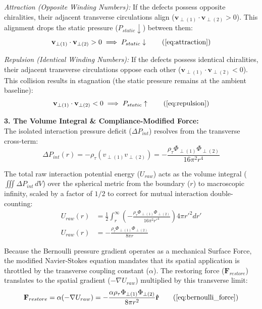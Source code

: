 \textit{Attraction (Opposite Winding Numbers):} If the defects possess opposite chiralities, their adjacent transverse circulations align ($\mathbf{v}_{\perp(1)} \cdot \mathbf{v}_{\perp(2)} > 0$). This alignment drops the static pressure ($P_{static} \downarrow$) between them:
\begin{equation}
    \mathbf{v}_{\perp(1)} \cdot \mathbf{v}_{\perp(2)} > 0 \implies P_{static} \downarrow \tag{\ref{eq:attraction}}
\end{equation}

\textit{Repulsion (Identical Winding Numbers):} If the defects possess identical chiralities, their adjacent transverse circulations oppose each other ($\mathbf{v}_{\perp(1)} \cdot \mathbf{v}_{\perp(2)} < 0$). This collision results in stagnation (the static pressure remains at the ambient baseline):
\begin{equation}
    \mathbf{v}_{\perp(1)} \cdot \mathbf{v}_{\perp(2)} < 0 \implies P_{static} \uparrow \tag{\ref{eq:repulsion}}
\end{equation}

\textbf{3. The Volume Integral \& Compliance-Modified Force:} \\
The isolated interaction pressure deficit ($\Delta P_{int}$) resolves from the transverse cross-term:
\begin{equation}
    \Delta P_{int}(r) = - \rho_{\tau} (v_{\perp(1)} v_{\perp(2)}) = - \frac{\rho_{\tau} \Phi_{\perp(1)} \Phi_{\perp(2)}}{16\pi^2 r^4}
\end{equation}

The total raw interaction potential energy ($U_{raw}$) acts as the volume integral ($\iiint \Delta P_{int} \, dV$) over the spherical metric from the boundary ($r$) to macroscopic infinity, scaled by a factor of $1/2$ to correct for mutual interaction double-counting:
\begin{align}
    U_{raw}(r) &= \frac{1}{2} \int_{r}^{\infty} \left( - \frac{\rho_{\tau} \Phi_{\perp(1)} \Phi_{\perp(2)}}{16\pi^2 r'^4} \right) 4\pi r'^2 dr' \nonumber \\
    U_{raw}(r) &= - \frac{\rho_{\tau} \Phi_{\perp(1)} \Phi_{\perp(2)}}{8\pi r}
\end{align}

Because the Bernoulli pressure gradient operates as a mechanical Surface Force, the modified Navier-Stokes equation mandates that its spatial application is throttled by the transverse coupling constant ($\alpha$). The restoring force ($\mathbf{F}_{restore}$) translates to the spatial gradient ($-\nabla U_{raw}$) multiplied by this transverse limit:
\begin{equation}
    \mathbf{F}_{restore} = \alpha (-\nabla U_{raw}) = - \frac{\alpha \rho_{\tau} \Phi_{\perp(1)} \Phi_{\perp(2)}}{8\pi r^2} \mathbf{\hat{r}} \tag{\ref{eq:bernoulli_force}}
\end{equation}

